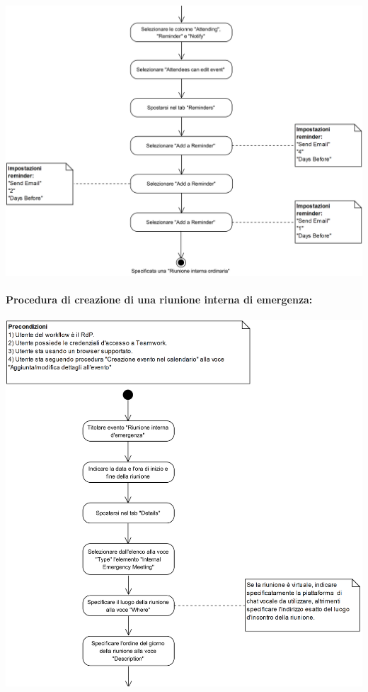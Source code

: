 \begin{center}
	\includegraphics[width=15cm]{./DiagrammiProcedure/RiunioneInternaOrdinaria2.png}
\end{center}

\paragraph{Procedura di creazione di una riunione interna di emergenza:}

\begin{center}
	\includegraphics[width=15cm]{./DiagrammiProcedure/RiunioneInternaDiEmergenza1.png}
\end{center}

